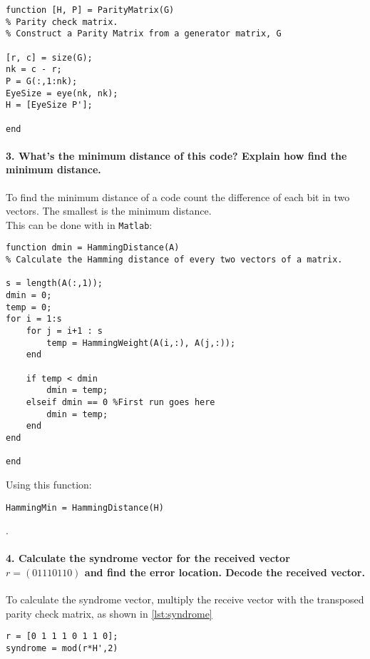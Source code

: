 \documentclass[Main]{subfiles}
\begin{document}
\begin{lstlisting}[caption=ParityMatrix, style=Code-Matlab, label=lst:Parity]
function [H, P] = ParityMatrix(G)
% Parity check matrix.
% Construct a Parity Matrix from a generator matrix, G

[r, c] = size(G);
nk = c - r;
P = G(:,1:nk);
EyeSize = eye(nk, nk);
H = [EyeSize P'];

end
\end{lstlisting}



\paragraph{3. What's the minimum distance of this code? Explain how find the
minimum distance.}
To find the minimum distance of a code count the difference of each bit in two vectors.
The smallest is the minimum distance.
\\
This can be done with in \texttt{Matlab}:

\begin{lstlisting}[caption=Minimum Hamming distance, style=Code-Matlab, label=lst:dmin]
function dmin = HammingDistance(A)
% Calculate the Hamming distance of every two vectors of a matrix.

s = length(A(:,1));
dmin = 0;
temp = 0;
for i = 1:s
    for j = i+1 : s
        temp = HammingWeight(A(i,:), A(j,:));
    end
    
    if temp < dmin
        dmin = temp;
    elseif dmin == 0 %First run goes here
        dmin = temp;
    end
end

end
\end{lstlisting}
Using this function:

\begin{lstlisting}[caption=Calculate the minimum distance, style=Code-Matlab, label=lst:]
HammingMin = HammingDistance(H)
\end{lstlisting}
.



\paragraph{4. Calculate the syndrome vector for the received vector $r = (01110110)$ and find the error location. Decode the received vector.}

To calculate the syndrome vector, multiply the receive vector with the transposed parity check matrix, as shown in \ref{lst:syndrome}


\begin{lstlisting}[caption=Syndrome vector, style=Code-Matlab, label=lst:syndrome]
r = [0 1 1 1 0 1 1 0];
syndrome = mod(r*H',2)
\end{lstlisting}
\end{document}
